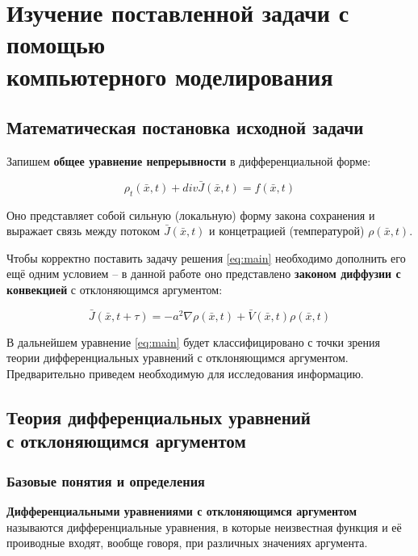 \section{Изучение поставленной задачи с помощью\\компьютерного моделирования}

\subsection{Математическая постановка исходной задачи}

Запишем \textbf{общее уравнение непрерывности} в дифференциальной форме:

\begin{equation}\label{eq:main}
\rho_t(\bar{x},t) + div \bar{J}(\bar{x},t) = f(\bar{x},t)
\end{equation}

Оно представляет собой сильную (локальную) форму закона сохранения и выражает связь между потоком $\bar{J} (\bar{x},t)$ и концетрацией (температурой) $\rho(\bar{x},t)$.

Чтобы корректно поставить задачу решения \ref{eq:main} необходимо дополнить его ещё одним условием \--- в данной работе оно представлено \textbf{законом диффузии с конвекцией} с отклоняющимся аргументом:

\begin{equation}\label{eq:diffusion-convection}
\bar{J}(\bar{x},t+\tau) = -a^2 \nabla \rho(\bar{x},t) + \bar{V}(\bar{x},t) \rho(\bar{x},t)
\end{equation}

В дальнейшем уравнение \ref{eq:main} будет классифицировано с точки зрения теории дифференциальных уравнений с отклоняющимся аргументом. Предварительно приведем необходимую для исследования информацию.

\subsection{Теория дифференциальных уравнений\\с отклоняющимся аргументом}

\subsubsection{Базовые понятия и определения}

\textbf{Дифференциальными уравнениями с отклоняющимся аргументом} называются дифференциальные уравнения, в которые неизвестная функция и её проиводные входят, вообще говоря, при различных значениях аргумента.

